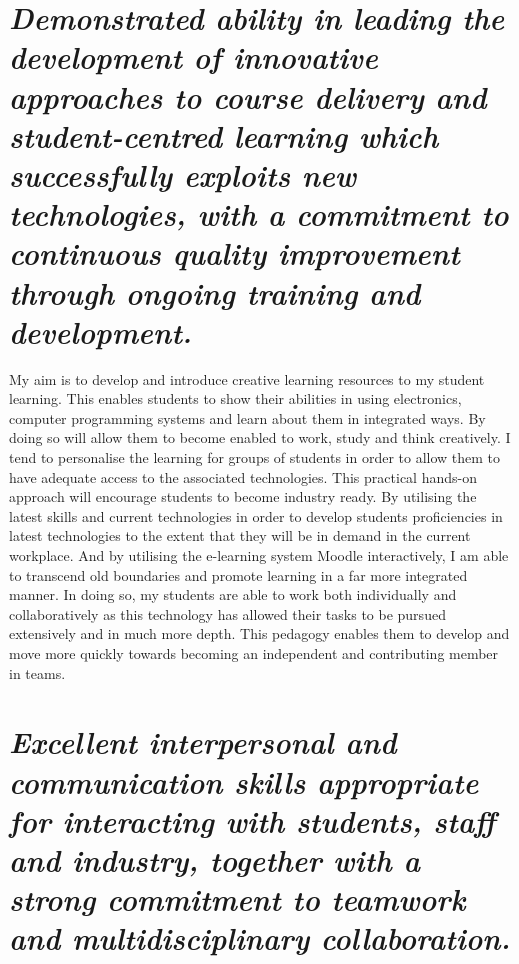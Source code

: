\documentclass{article}
\begin{document}
\section{\textit{\fontsize{12}{12}\selectfont Demonstrated ability in leading the development of innovative approaches to course delivery and student-centred learning which successfully exploits new technologies, with a commitment to continuous quality improvement through ongoing training and development.}}

My aim is to develop and introduce creative learning resources to my student learning. This enables students to show their abilities in using electronics, computer programming systems and learn about them in integrated ways.  By doing so will allow them to become enabled to work, study and think creatively. I tend to personalise the learning for groups of students in order to allow them to have adequate access to the associated technologies. This practical hands-on approach will encourage students to become industry ready.  By utilising the latest skills and current technologies in order to develop students proficiencies in latest technologies to the extent that they will be in demand in the current workplace.  And by utilising the e-learning system Moodle interactively, I am able to transcend old boundaries and promote learning in a far more integrated manner. In doing so, my students are able to work both individually and collaboratively as this technology has allowed their tasks to be pursued extensively and in much more depth. This pedagogy enables them to develop and move more quickly towards becoming an independent and contributing member in teams.


\section{\textit{\fontsize{12}{12}\selectfont Excellent interpersonal and communication skills appropriate for interacting with students, staff and industry, together with a strong commitment to teamwork and multidisciplinary collaboration.}}
\end{document}
